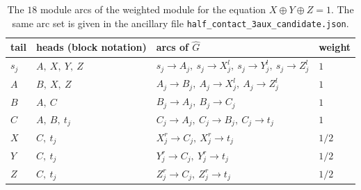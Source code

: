 \documentclass[11pt]{amsart}
\theoremstyle{definition}
\theoremstyle{remark}
\numberwithin{equation}{section}
\newcommand{\Gh}{\widehat{G}}
\begin{document}
\begin{table}[ht]
\centering
\begin{tabular}{@{}llll@{}}
\toprule
tail & heads (block notation) & arcs of $\Gh$ & weight\\
\midrule
$s_j$ & $A,\ X,\ Y,\ Z$ & $s_j\to A_j,\ s_j\to X_j^l,\ s_j\to Y_j^l,\ s_j\to Z_j^l$ & $1$\\
$A$ & $B,\ X,\ Z$ & $A_j\to B_j,\ A_j\to X_j^l,\ A_j\to Z_j^l$ & $1$\\
$B$ & $A,\ C$ & $B_j\to A_j,\ B_j\to C_j$ & $1$\\
$C$ & $A,\ B,\ t_j$ & $C_j\to A_j,\ C_j\to B_j,\ C_j\to t_j$ & $1$\\
$X$ & $C,\ t_j$ & $X_j^r\to C_j,\ X_j^r\to t_j$ & $1/2$\\
$Y$ & $C,\ t_j$ & $Y_j^r\to C_j,\ Y_j^r\to t_j$ & $1/2$\\
$Z$ & $C,\ t_j$ & $Z_j^r\to C_j,\ Z_j^r\to t_j$ & $1/2$\\
\bottomrule
\end{tabular}
\medskip
\caption{The $18$ module arcs of the weighted module for the equation $X\oplus Y\oplus Z=1$. The same arc set is given in the ancillary file \texttt{half\_contact\_\allowbreak 3aux\_\allowbreak candidate.json}.}
\label{tab:warcs}
\end{table}
\end{document}
